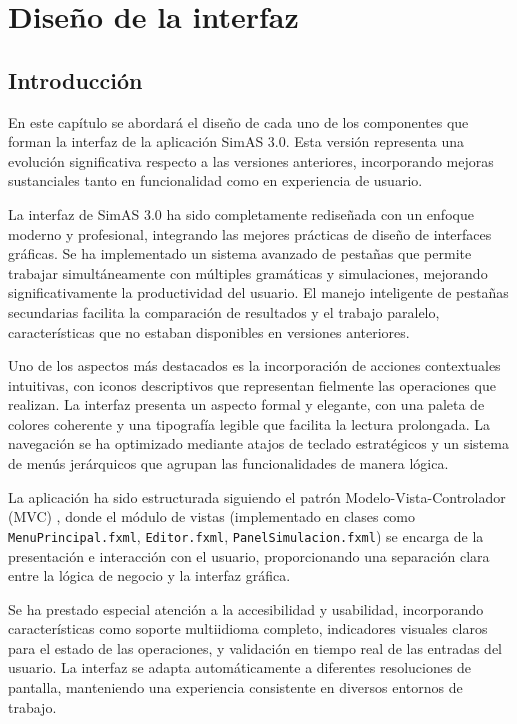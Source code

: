 \chapter{Diseño de la interfaz} \label{cap:diseño_interfaz}

 \section{Introducción}

En este capítulo se abordará el diseño de cada uno de los componentes que forman la interfaz de la aplicación SimAS 3.0. Esta versión representa una evolución significativa respecto a las versiones anteriores, incorporando mejoras sustanciales tanto en funcionalidad como en experiencia de usuario.

La interfaz de SimAS 3.0 ha sido completamente rediseñada con un enfoque moderno y profesional, integrando las mejores prácticas de diseño de interfaces gráficas. Se ha implementado un sistema avanzado de pestañas que permite trabajar simultáneamente con múltiples gramáticas y simulaciones, mejorando significativamente la productividad del usuario. El manejo inteligente de pestañas secundarias facilita la comparación de resultados y el trabajo paralelo, características que no estaban disponibles en versiones anteriores.

Uno de los aspectos más destacados es la incorporación de acciones contextuales intuitivas, con iconos descriptivos que representan fielmente las operaciones que realizan. La interfaz presenta un aspecto formal y elegante, con una paleta de colores coherente y una tipografía legible que facilita la lectura prolongada. La navegación se ha optimizado mediante atajos de teclado estratégicos y un sistema de menús jerárquicos que agrupan las funcionalidades de manera lógica.

La aplicación ha sido estructurada siguiendo el patrón Modelo-Vista-Controlador (MVC) \cite{mvc-pattern}, donde el módulo de vistas (implementado en clases como \texttt{MenuPrincipal.fxml}, \texttt{Editor.fxml}, \texttt{PanelSimulacion.fxml}) se encarga de la presentación e interacción con el usuario, proporcionando una separación clara entre la lógica de negocio y la interfaz gráfica.

Se ha prestado especial atención a la accesibilidad y usabilidad, incorporando características como soporte multiidioma completo, indicadores visuales claros para el estado de las operaciones, y validación en tiempo real de las entradas del usuario. La interfaz se adapta automáticamente a diferentes resoluciones de pantalla, manteniendo una experiencia consistente en diversos entornos de trabajo.

